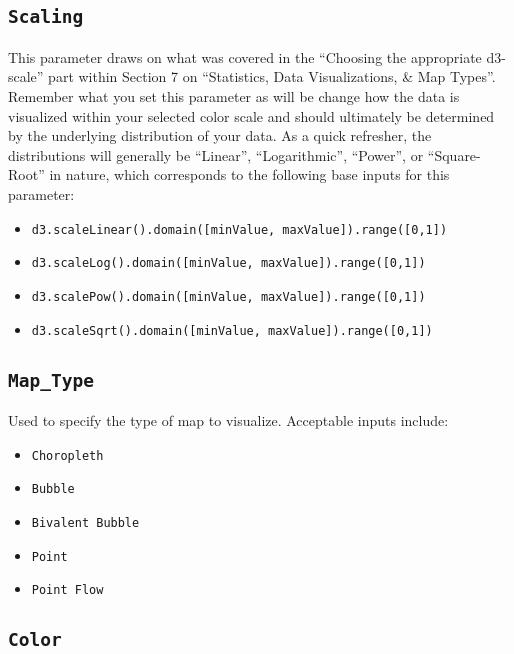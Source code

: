 \documentclass[
]{book}
\providecommand{\tightlist}{%
  \setlength{\itemsep}{0pt}\setlength{\parskip}{0pt}}
\begin{document}
\hypertarget{scaling}{%
\subsection*{\texorpdfstring{\texttt{Scaling}}{Scaling}}\label{scaling}}


This parameter draws on what was covered in the ``Choosing the appropriate d3-scale'' part within Section 7 on ``Statistics, Data Visualizations, \& Map Types''. Remember what you set this parameter as will be change how the data is visualized within your selected color scale and should ultimately be determined by the underlying distribution of your data. As a quick refresher, the distributions will generally be ``Linear'', ``Logarithmic'', ``Power'', or ``Square-Root'' in nature, which corresponds to the following base inputs for this parameter:

\begin{itemize}
\tightlist
\item
  \texttt{d3.scaleLinear().domain({[}minValue,\ maxValue{]}).range({[}0,1{]})}
\item
  \texttt{d3.scaleLog().domain({[}minValue,\ maxValue{]}).range({[}0,1{]})}
\item
  \texttt{d3.scalePow().domain({[}minValue,\ maxValue{]}).range({[}0,1{]})}
\item
  \texttt{d3.scaleSqrt().domain({[}minValue,\ maxValue{]}).range({[}0,1{]})}
\end{itemize}

\hypertarget{map_type}{%
\subsection*{\texorpdfstring{\texttt{Map\_Type}}{Map\_Type}}\label{map_type}}


Used to specify the type of map to visualize. Acceptable inputs include:

\begin{itemize}
\tightlist
\item
  \texttt{Choropleth}
\item
  \texttt{Bubble}
\item
  \texttt{Bivalent\ Bubble}
\item
  \texttt{Point}
\item
  \texttt{Point\ Flow}
\end{itemize}

\hypertarget{color}{%
\subsection*{\texorpdfstring{\texttt{Color}}{Color}}\label{color}}
\end{document}
